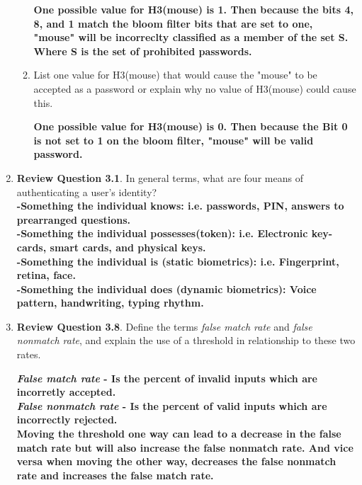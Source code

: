 \documentclass[12pt]{article}
\begin{document}
\begin{enumerate}
\begin{enumerate}
\textbf{One possible value for H3(mouse) is 1. Then because the bits 4, 8, and 1 match the bloom filter bits that are set to one, "mouse" will be incorreclty classified as a member of the set S. Where S is the set of prohibited passwords.} \\

\item List one value for H3(mouse) that would cause the "mouse" to be accepted as a password or explain why no value of H3(mouse) could cause this.

\textbf{One possible value for H3(mouse) is 0. Then because the Bit 0 is not set to 1 on the bloom filter, "mouse" will be valid password.} \\

\end{enumerate}

\item{\textbf{Review Question 3.1}. In general terms, what are four means of authenticating a user's identity?} \\

\textbf{-Something the individual knows: i.e. passwords, PIN, answers to prearranged questions.} \\
\textbf{-Something the individual possesses(token): i.e. Electronic key-cards, smart cards, and physical keys.}\\
\textbf{-Something the individual is (static biometrics): i.e. Fingerprint, retina, face.}\\
\textbf{-Something the individual does (dynamic biometrics): Voice pattern, handwriting, typing rhythm.}\\


\item{\textbf{Review Question 3.8}. Define the terms \textit{false match rate} and \textit{false nonmatch rate}, and explain the use of a threshold in relationship to these two rates.}

\textbf{\textit{False match rate} - Is the percent of invalid inputs which are incorretly accepted.} \\

\textbf{\textit{False nonmatch rate} - Is the percent of valid inputs which are incorrectly rejected.} \\

\textbf{Moving the threshold one way can lead to a decrease in the false match rate but will also increase the false nonmatch rate. And vice versa when moving the other way, decreases the false nonmatch rate and increases the false match rate.}


\end{enumerate}
\end{document}
